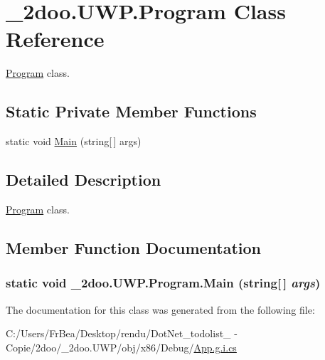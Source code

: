 \hypertarget{class__2doo_1_1_u_w_p_1_1_program}{
\section{\_\-2doo.UWP.Program Class Reference}
\label{class__2doo_1_1_u_w_p_1_1_program}
}
\hyperlink{class__2doo_1_1_u_w_p_1_1_program}{Program} class.  


\subsection*{Static Private Member Functions}
\begin{CompactItemize}
\item 
static void \hyperlink{class__2doo_1_1_u_w_p_1_1_program_d889dc8a29422fea958498041e711de4}{Main} (string\mbox{[}$\,$\mbox{]} args)
\end{CompactItemize}


\subsection{Detailed Description}
\hyperlink{class__2doo_1_1_u_w_p_1_1_program}{Program} class. 



\subsection{Member Function Documentation}
\hypertarget{class__2doo_1_1_u_w_p_1_1_program_d889dc8a29422fea958498041e711de4}{
\subsubsection[{Main}]{\setlength{\rightskip}{0pt plus 5cm}static void \_\-2doo.UWP.Program.Main (string\mbox{[}$\,$\mbox{]} {\em args})}}
\label{class__2doo_1_1_u_w_p_1_1_program_d889dc8a29422fea958498041e711de4}




The documentation for this class was generated from the following file:\begin{CompactItemize}
\item 
C:/Users/FrBea/Desktop/rendu/DotNet\_\-todolist\_ - Copie/2doo/\_\-2doo.UWP/obj/x86/Debug/\hyperlink{_app_8g_8i_8cs}{App.g.i.cs}\end{CompactItemize}
